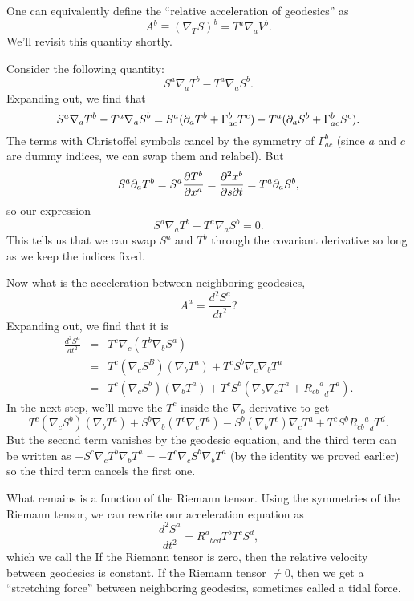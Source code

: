 One can equivalently define the ``relative acceleration of geodesics'' as
$$A^b \equiv (\nabla_T S)^b = T^a \nabla_a V^b.$$ We'll revisit this quantity shortly.

\begin{lem}
Consider the following quantity:
$$S^a \nabla_a T^b-T^a \nabla_a S^b.$$ 
Expanding out, we find that $$S^a\nabla_a T^b- T^a \nabla_a S^b= S^a (\partial_a T^b +\Gamma^b_{ac} T^c) - T^a (\partial_a S^b +\Gamma^b_{ac} S^c).$$
The terms with Christoffel symbols cancel by the symmetry of $\Gamma^b_{ac}$ (since $a$ and $c$ are dummy indices, we can swap them and relabel). But $$S^a \partial_a T^b = S^a \frac{\partial T^b}{\partial x^a} = \frac{\partial^2 x^b}{\partial s\partial t} = T^a \partial_a S^b,$$
so our expression
$$S^a \nabla_a T^b-T^a \nabla_a S^b=0.$$
This tells us that we can swap $S^a$ and $T^b$ through the covariant derivative so long as we keep the indices fixed.
\end{lem}

Now what is the acceleration between neighboring geodesics,
$$A^a =\frac{d^2S^a}{dt^2}?$$
Expanding out, we find that it is
\begin{eqnarray*}
\frac{d^2S^a}{dt^2}&=&T^c \nabla_c(T^b \nabla_b S^a)\\
&=&T^c (\nabla_c S^B)(\nabla_b T^a)+T^c S^b \nabla_c \nabla_b T^a\\
&=& T^c(\nabla_c S^b)(\nabla_b T^a)+T^c S^b(\nabla_b \nabla_c T^a +{{R_{cb}}^a}_d T^d).
\end{eqnarray*}
In the next step, we'll move the $T^c$ inside the $\nabla_b$ derivative to get
$$T^c(\nabla_c S^b)(\nabla_b T^a)+S^b\nabla_b(T^c \nabla_c T^a) - S^b(\nabla_b T^c) \nabla_c T^a+T^c S^b{{R_{cb}}^a}_d T^d.$$
But the second term vanishes by the geodesic equation, and the third term can be written as
$-S^c \nabla_c T^b \nabla_b T^a = -T^c \nabla_c S^b \nabla_b T^a$ (by the identity we proved earlier) so the third term cancels the first one.

What remains is a function of the Riemann tensor. Using the symmetries of the Riemann tensor, we can rewrite our acceleration equation as
$$\frac{d^2S^a}{dt^2}={R^a}_{bcd} T^b T^c S^d,$$
which we call the  If the Riemann tensor is zero, then the relative velocity between geodesics is constant. If the Riemann tensor $\neq 0$, then we get a ``stretching force'' between neighboring geodesics, sometimes called a tidal force.